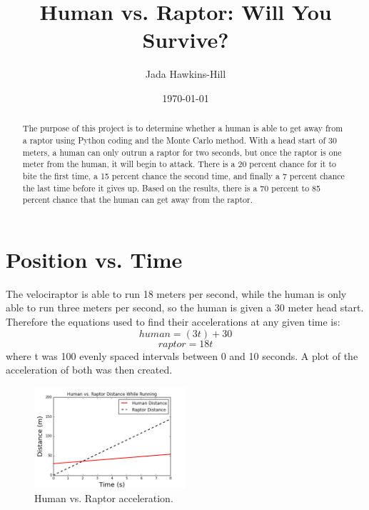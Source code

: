\documentclass[twocolumn]{revtex4}
\begin{document}
\title{
Human vs. Raptor: Will You Survive?
}

\author{Jada Hawkins-Hill}

\date{\today}

\begin{abstract}
    The purpose of this project is to determine whether a human is able to get away from a raptor using Python coding and the Monte Carlo method. With a head start of 30 meters, a human can only outrun a raptor for two seconds, but once the raptor is one meter from the human, it will begin to attack. There is a 20 percent chance for it to bite the first time, a 15 percent chance the second time, and finally a 7 percent chance the last time before it gives up. Based on the results, there is a 70 percent to 85 percent chance that the human can get away from the raptor.
\end{abstract}

\maketitle

\section{Position vs. Time}
The velociraptor is able to run 18 meters per second, while the human is only able to run three meters per second, so the human is given a 30 meter head start. Therefore the equations used to find their accelerations at any given time is:
$$human = (3t) + 30$$
$$raptor = 18t$$
where t was 100 evenly spaced intervals between 0 and 10 seconds.
A plot of the acceleration of both was then created.
\begin{figure}[h!]
	\centering
	\includegraphics[width=0.5\textwidth]{HVR.png}
	\caption{Human vs. Raptor acceleration. \label{fig:HVR}}
\end{figure}
\end{document}

